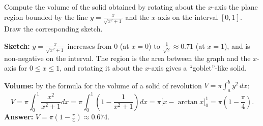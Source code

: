 
\begin{question}
Compute the volume of the solid obtained by rotating about the $x$-axis the plane region bounded by the line $y=\frac{x}{\sqrt{x^2+1}}$ and the $x$-axis on the interval $[0,1]$. Draw the corresponding sketch.
\end{question}

\begin{solution}
\textbf{Sketch:} $y=\frac{x}{\sqrt{x^2+1}}$ increases from $0$ (at $x=0$) to $\frac1{\sqrt2}\approx0.71$ (at $x=1$), and is non-negative on the interval. The region is the area between the graph and the $x$-axis for $0\le x\le1$, and rotating it about the $x$-axis gives a ``goblet''-like solid.

\textbf{Volume:} by the formula for the volume of a solid of revolution $V=\pi\int_a^by^2\,dx$:
\[
V=\pi\int_0^1\frac{x^2}{x^2+1}dx=\pi\int_0^1\left(1-\frac{1}{x^2+1}\right)dx=\pi\Big[x-\arctan x\Big]_0^1=\pi\left(1-\frac\pi4\right).
\]
\textbf{Answer:} $V=\pi\left(1-\frac\pi4\right)\approx0.674$.
\end{solution}
